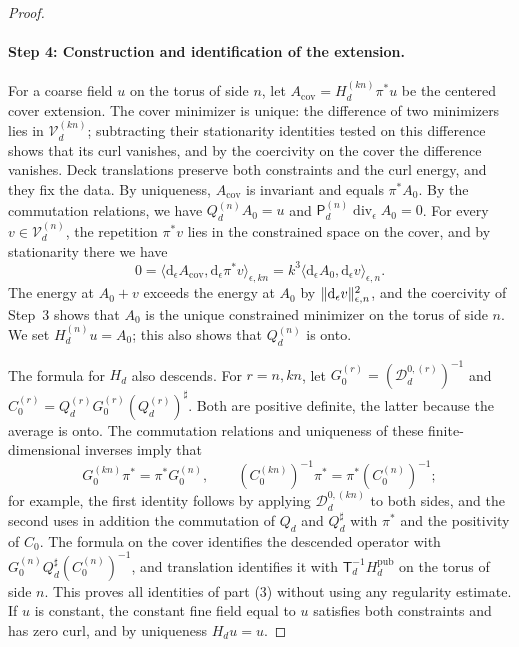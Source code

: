 \begin{proof}
\paragraph{Step 4: Construction and identification of the extension.}
For a coarse field $u$ on the torus of side $n$, let $A_{\mathrm{cov}}=H_d^{(kn)}\pi^*u$ be the centered cover extension. The cover minimizer is unique: the difference of two minimizers lies in $\mathcal V_d^{(kn)}$; subtracting their stationarity identities tested on this difference shows that its curl vanishes, and by the coercivity on the cover the difference vanishes. Deck translations preserve both constraints and the curl energy, and they fix the data. By uniqueness, $A_{\mathrm{cov}}$ is invariant and equals $\pi^*A_0$. By the commutation relations, we have $Q_d^{(n)}A_0=u$ and $\mathsf P_d^{(n)}\operatorname{div}_\epsilon A_0=0$. For every $v\in\mathcal V_d^{(n)}$, the repetition $\pi^*v$ lies in the constrained space on the cover, and by stationarity there we have
\[
 0=\langle\mathrm d_\epsilon A_{\mathrm{cov}},\mathrm d_\epsilon\pi^*v\rangle_{\epsilon,kn}=k^3\langle\mathrm d_\epsilon A_0,\mathrm d_\epsilon v\rangle_{\epsilon,n}.
\]
The energy at $A_0+v$ exceeds the energy at $A_0$ by $\lVert \mathrm d_\epsilon v\rVert_{\epsilon,n}^2$, and the coercivity of Step~3 shows that $A_0$ is the unique constrained minimizer on the torus of side $n$. We set $H_d^{(n)}u=A_0$; this also shows that $Q_d^{(n)}$ is onto.

The formula for $H_d$ also descends. For $r=n,kn$, let $G_0^{(r)}=(\mathscr D_d^{0,(r)})^{-1}$ and $C_0^{(r)}=Q_d^{(r)}G_0^{(r)}(Q_d^{(r)})^\sharp$. Both are positive definite, the latter because the average is onto. The commutation relations and uniqueness of these finite-dimensional inverses imply that
\[
 G_0^{(kn)}\pi^*=\pi^*G_0^{(n)},\qquad(C_0^{(kn)})^{-1}\pi^*=\pi^*(C_0^{(n)})^{-1};
\]
for example, the first identity follows by applying $\mathscr D_d^{0,(kn)}$ to both sides, and the second uses in addition the commutation of $Q_d$ and $Q_d^\sharp$ with $\pi^*$ and the positivity of $C_0$. The formula on the cover identifies the descended operator with $G_0^{(n)}Q_d^\sharp(C_0^{(n)})^{-1}$, and translation identifies it with $\mathsf T_d^{-1}H_d^{\mathrm{pub}}$ on the torus of side $n$. This proves all identities of part (3) without using any regularity estimate. If $u$ is constant, the constant fine field equal to $u$ satisfies both constraints and has zero curl, and by uniqueness $H_du=u$.


\end{proof}
